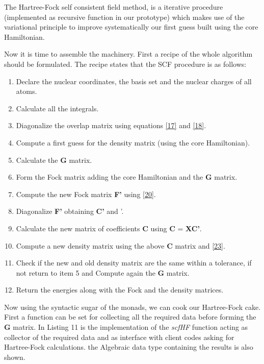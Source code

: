 \documentclass{tmr}
\begin{document}
The Hartree-Fock self consistent field method, is a iterative procedure
(implemented as recursive function in our prototype) which makes use of
the variational principle to improve systematically our first guess built 
using the core Hamiltonian.

Now it is time to assemble the machinery. First a recipe of the 
whole algorithm should be formulated. The recipe states that the SCF procedure is 
as follows:

\begin{enumerate}
\item Declare the nuclear coordinates, the basis set and the nuclear
charges of all atoms.
\item Calculate all the integrals.
\item Diagonalize the overlap matrix using equations \eqref{17} and \eqref{18}.
\item Compute a first guess for the density matrix (using the core Hamiltonian).
\item Calculate the \textbf{G} matrix.
\item Form the Fock matrix adding the core Hamiltonian and the \textbf{G} matrix.
\item Compute the new Fock matrix \textbf{F'} using \eqref{20}.
\item Diagonalize \textbf{F'} obtaining \textbf{C'} and \textepsilon'.
\item Calculate the new matrix of coefficients \textbf{C} using \textbf{C} = \textbf{XC'}.  
\item Compute a new density matrix using the above \textbf{C} matrix and \eqref{23}.
\item Check if the new and old density matrix are the same within a tolerance, if not 
      return to item 5 and Compute again the \textbf{G} matrix. 
\item Return the energies along with the Fock and the density matrices.
\end{enumerate}
Now using the syntactic sugar of the monads, we can cook our Hartree-Fock cake. First 
a function can be set for collecting all the required data before forming the 
\textbf{G} matrix. In Listing 11 is the implementation of the \textit{scfHF} function acting
as collector of the required data and as interface with client codes asking
for Hartree-Fock calculations. the Algebraic data type containing the results 
is also shown.
\end{document}
